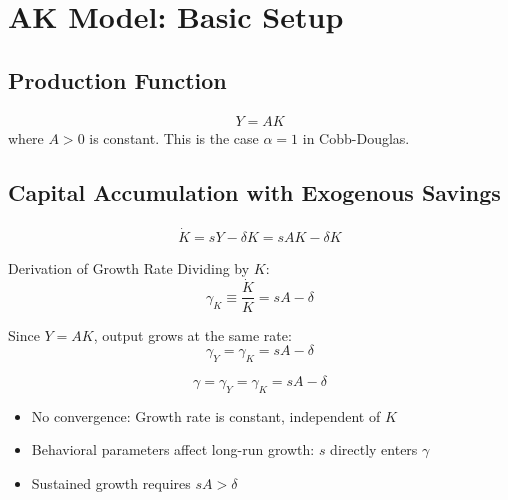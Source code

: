 \documentclass[a4paper,11pt]{article}
\begin{document}
\clearpage

\section{AK Model: Basic Setup}

\subsection*{Production Function}
\begin{align*}
Y = A K \tag{AK Production}
\end{align*}
where $A > 0$ is constant. This is the case $\alpha = 1$ in Cobb-Douglas.

\medskip
\subsection*{Capital Accumulation with Exogenous Savings}
\begin{align*}
\dot{K} = sY - \delta K = sAK - \delta K \tag{AK Accumulation}
\end{align*}

\begin{derivationbox}{Derivation of Growth Rate}
Dividing by $K$:
\[
\gamma_K \equiv \frac{\dot{K}}{K} = sA - \delta
\]

Since $Y = AK$, output grows at the same rate:
\[
\gamma_Y = \gamma_K = sA - \delta
\]
\end{derivationbox}

\begin{resultbox}
\[
\boxed{\gamma = \gamma_Y = \gamma_K = sA - \delta}
\tag{AK Growth Rate}
\]
\end{resultbox}

\medskip
\begin{tcolorbox}[colback=yellow!10,colframe=yellow!60,title=Key Properties]
\begin{itemize}
    \item No convergence: Growth rate is constant, independent of $K$
    \item Behavioral parameters affect long-run growth: $s$ directly enters $\gamma$
    \item Sustained growth requires $sA > \delta$
\end{itemize}
\end{tcolorbox}
\end{document}
